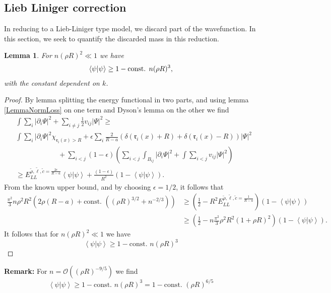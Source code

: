 \documentclass[a4paper,11pt]{article}
\newcommand{\abs}[1]{\left\lvert #1 \right\rvert}
\renewcommand{\braket}[1]{\left\langle#1\right\rangle}
\newtheorem{lemma}{Lemma}
\numberwithin{equation}{section}
\begin{document}
	\subsection{Lieb Liniger correction}
	In reducing to a Lieb-Liniger type model, we discard part of the wavefunction. In this section, we seek to quantify the discarded mass in this reduction.
			\begin{lemma}\label{LemmaImprovedMassBound}
				For $ n(\rho R)^2\ll 1 $ we have
				\begin{equation}\label{EqImprovedMassBound}
				\begin{aligned}
				\braket{\psi|\psi} \geq 1-\textnormal{const. }n(\rho R)^3,
				\end{aligned}
				\end{equation}
				with the constant dependent on $ k $.
			\end{lemma}
			\begin{proof}
				By lemma splitting the energy functional in two parts, and using lemma \ref{LemmaNormLoss} on one term and Dyson's lemma on the other we find 
				\begin{equation}
				\begin{aligned}
				&\int \sum_{i}\abs{\partial_i\Psi}^2+\sum_{i\neq j} \frac{1}{2}v_{ij}\abs{\Psi}^2\geq\\ &\int\sum_{i}\abs{\partial_i\Psi}^2\chi_{\mathfrak{r}_i(x)>R}+\epsilon\sum_{i}\frac{2}{R-a}(\delta(\mathfrak{r}_i(x)+R)+\delta(\mathfrak{r}_i(x)-R))\abs{\Psi}^2\\&\qquad\qquad\qquad+\sum_{i< j} (1-\epsilon)\left(\sum_{i<j}\int_{B_{ij}}\abs{\partial_i \Psi}^2+\int\sum_{i<j} v_{ij} \abs{\Psi}^2\right)\\
				&\geq E_{LL}^{\tilde{\rho},\tilde{\ell},\tilde{c}=\frac{2\epsilon}{R-a}}\braket{\psi|\psi}+ \frac{(1-\epsilon)}{R^2}(1-\braket{\psi|\psi}).
				\end{aligned}
				\end{equation}
				From the known upper bound, and by choosing $ \epsilon=1/2 $, it follows that 
				\begin{equation}
				\begin{aligned}
				\frac{\pi^2}{3}n\rho^2R^2\left(2\rho (R-a)+\text{const. }\left((\rho R)^{3/2}+n^{-2/3}\right)\right)&\geq \left(\frac{1}{2}-R^2E_{LL}^{\tilde{\rho},\tilde{\ell},\tilde{c}=\frac{1}{R-a}}\right)\left(1-\braket{\psi|\psi}\right)\\
				&\geq \left(\frac{1}{2}-n\frac{\pi^2}{3}\rho^2R^2(1+\rho R)^2\right)\left(1-\braket{\psi|\psi}\right).
				\end{aligned}
				\end{equation}
				It follows that for $ n (\rho R)^2\ll 1 $ we have \begin{equation}
				\braket{\psi|\psi}\geq 1-\text{const. }n(\rho R)^3
				\end{equation}
				\end{proof}
		\textbf{Remark:} For $ n=\mathcal{O}((\rho R)^{-9/5}) $ we find \begin{equation}
				\braket{\psi|\psi}\geq 1-\text{const. }n(\rho R)^3=1-\text{const. }(\rho R)^{6/5}
				\end{equation}
	
\end{document}
